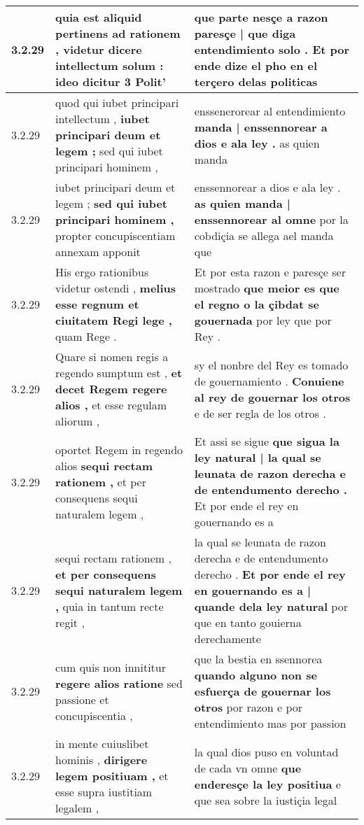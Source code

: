 \begin{tabular}{|p{1cm}|p{6.5cm}|p{6.5cm}|}
3.2.29 & quia est aliquid pertinens ad rationem , \textbf{ videtur dicere intellectum solum : } ideo dicitur 3 Polit’ & que parte nesçe \textbf{ a razon paresçe | que diga entendimiento solo . } Et por ende dize el pho en el terçero delas politicas \\\hline
3.2.29 & quod qui iubet principari intellectum , \textbf{ iubet principari deum et legem ; } sed qui iubet principari hominem , & enssenerorear al entendimiento \textbf{ manda | enssennorear a dios e ala ley . } as quien manda \\\hline
3.2.29 & iubet principari deum et legem ; \textbf{ sed qui iubet principari hominem , } propter concupiscentiam annexam apponit & enssennorear a dios e ala ley . \textbf{ as quien manda | enssennorear al omne } por la cobdiçia se allega ael manda que \\\hline
3.2.29 & His ergo rationibus videtur ostendi , \textbf{ melius esse regnum et ciuitatem Regi lege , } quam Rege . & Et por esta razon e paresçe ser mostrado \textbf{ que meior es que el regno o la çibdat se gouernada } por ley que por Rey . \\\hline
3.2.29 & Quare si nomen regis a regendo sumptum est , \textbf{ et decet Regem regere alios , } et esse regulam aliorum , & sy el nonbre del Rey es tomado de gouernamiento . \textbf{ Conuiene al rey de gouernar los otros } e de ser regla de los otros . \\\hline
3.2.29 & oportet Regem in regendo alios \textbf{ sequi rectam rationem , } et per consequens sequi naturalem legem , & Et assi se sigue \textbf{ que sigua la ley natural | la qual se leunata de razon derecha e de entendumento derecho . } Et por ende el rey en gouernando es a \\\hline
3.2.29 & sequi rectam rationem , \textbf{ et per consequens sequi naturalem legem , } quia in tantum recte regit , & la qual se leunata de razon derecha e de entendumento derecho . \textbf{ Et por ende el rey en gouernando es a | quande dela ley natural } por que en tanto gouierna derechamente \\\hline
3.2.29 & cum quis non innititur \textbf{ regere alios ratione } sed passione et concupiscentia , & que la bestia en ssennorea \textbf{ quando alguno non se esfuerça de gouernar los otros } por razon e por entendimiento mas por passion \\\hline
3.2.29 & in mente cuiuslibet hominis , \textbf{ dirigere legem positiuam , } et esse supra iustitiam legalem , & la qual dios puso en voluntad de cada vn omne \textbf{ que enderesçe la ley positiua } e que sea sobre la iustiçia legal \\\hline

\end{tabular}
